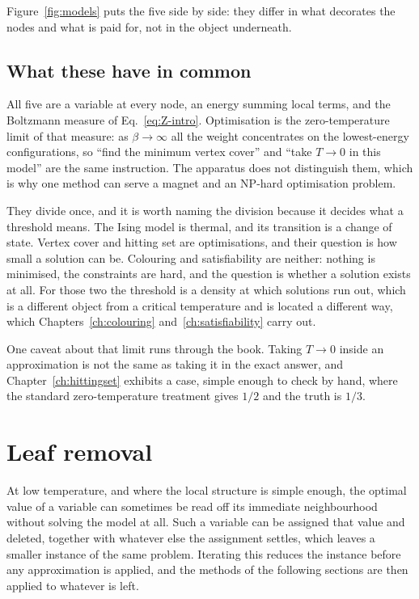 Figure~\ref{fig:models} puts the five side by side: they differ in what
decorates the nodes and what is paid for, not in the object underneath.

\subsection{What these have in common}

All five are a variable at every node, an energy summing local terms, and the
Boltzmann measure of Eq.~\eqref{eq:Z-intro}. Optimisation is the
zero-temperature limit of that measure: as $\beta\to\infty$ all the weight
concentrates on the lowest-energy configurations, so ``find the minimum vertex
cover'' and ``take $T\to0$ in this model'' are the same instruction. The
apparatus does not distinguish them, which is why one method can serve a
magnet and an NP-hard optimisation problem.

They divide once, and it is worth naming the division because it decides what a
threshold means. The Ising model is thermal, and its transition is a change of
state. Vertex cover and hitting set are optimisations, and their question is how
small a solution can be. Colouring and satisfiability are neither: nothing is
minimised, the constraints are hard, and the question is whether a solution
exists at all. For those two the threshold is a density at which solutions run
out, which is a different object from a critical temperature and is located a
different way, which Chapters~\ref{ch:colouring}
and~\ref{ch:satisfiability} carry out.

One caveat about that limit runs through the book. Taking
$T\to0$ inside an approximation is not the same as taking it in the exact
answer, and Chapter~\ref{ch:hittingset} exhibits a case, simple enough to check
by hand, where the standard zero-temperature treatment gives $1/2$ and the truth
is $1/3$.

\section{Leaf removal}
\label{sec:leafremoval-intro}

At low temperature, and where the local structure is simple enough, the optimal
value of a variable can sometimes be read off its immediate neighbourhood
without solving the model at all. Such a variable can be assigned that value
and deleted, together with whatever else the assignment settles, which leaves a
smaller instance of the same problem. Iterating this reduces the instance
before any approximation is applied, and the methods of the following sections
are then applied to whatever is left.

